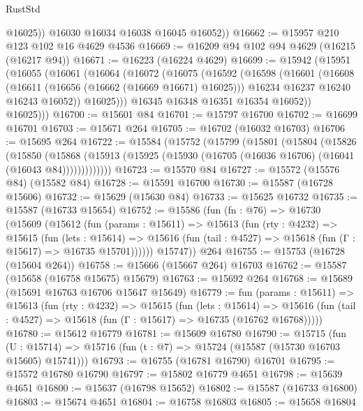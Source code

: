 \begin{lexlean}{RustStd}
\begin{coremodule}
            @16025))
        @16030
        @16034
        @16038
        @16045
        @16052))
@16662 := @15957 @210 @123 @102 @16 @4629 @4536
@16669 := @16209 @94 @102 @94 @4629 (@16215 (@16217 @94))
@16671 := @16223 (@16224 @4629)
@16699 := @15942
    (@15951
      (@16055
        (@16061
          (@16064
            (@16072
              (@16075
                (@16592
                  (@16598
                    (@16601
                      (@16608
                        (@16611 (@16656 (@16662 (@16669 @16671) @16025)))
                        @16234
                        @16237
                        @16240
                        @16243
                        @16052))
                    @16025)))
              @16345
              @16348
              @16351
              @16354
              @16052))
          @16025)))
@16700 := @15601 @84
@16701 := @15797 @16700
@16702 := @16699 @16701
@16703 := @15671 @264
@16705 := @16702 (@16032 @16703)
@16706 := @15695 @264
@16722 := @15584
    (@15752
      (@15799
        (@15801
          (@15804
            (@15826
              (@15850
                (@15868
                  (@15913 (@15925 (@15930 (@16705 (@16036 @16706) (@16041 (@16043 @84)))))))))))))
@16723 := @15570 @84
@16727 := @15572 (@15576 @84) (@15582 @84)
@16728 := @15591 @16700
@16730 := @15587 (@16728 @15606)
@16732 := @15629 (@15630 @84)
@16733 := @15625 @16732
@16735 := @15587 (@16733 @15654)
@16752 := @15586
    (fun (fn : @76) =>
    @16730
      (@15609
        (@15612
          (fun (params : @15611) =>
          @15613
            (fun (rty : @4232) =>
            @15615
              (fun (lets : @15614) =>
              @15616 (fun (tail : @4527) => @15618 (fun (Γ : @15617) => @16735 @15701))))))
        @15747))
    @264
@16755 := @15753 (@16728 (@15604 @264))
@16758 := @15666 (@15667 @264) @16703
@16762 := @15587 (@15658 (@16758 @15675) @15679)
@16763 := @15692 @264
@16768 := @15689 (@15691 @16763 @16706 @15647 @15649)
@16779 := fun (params : @15611) =>
  @15613
    (fun (rty : @4232) =>
    @15615
      (fun (lets : @15614) =>
      @15616 (fun (tail : @4527) => @15618 (fun (Γ : @15617) => @16735 (@16762 @16768)))))
@16780 := @15612 @16779
@16781 := @15609 @16780
@16790 := @15715
    (fun (U : @15714) => @15716 (fun (t : @7) => @15724 (@15587 (@15730 @16703 @15605) @15741)))
@16793 := @16755 (@16781 @16790) @16701
@16795 := @15572 @16780 @16790
@16797 := @15802 @16779 @4651
@16798 := @15639 @4651
@16800 := @15637 (@16798 @15652)
@16802 := @15587 (@16733 @16800)
@16803 := @15674 @4651
@16804 := @16758 @16803
@16805 := @15658 @16804

\end{coremodule}
\end{lexlean}
